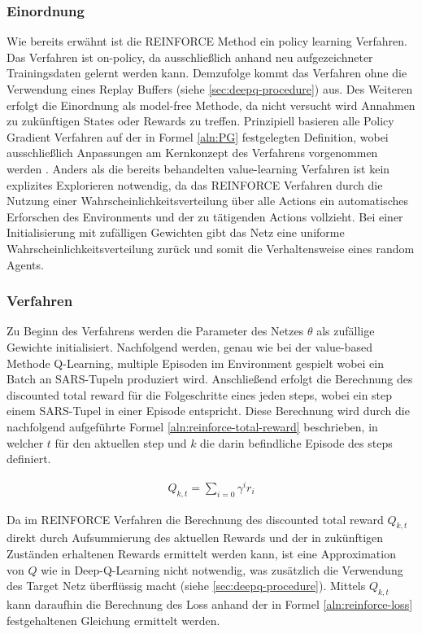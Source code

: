 \documentclass[11pt]{scrartcl}
\begin{document}
\subsubsection{Einordnung}
Wie bereits erwähnt ist die REINFORCE Method ein policy learning Verfahren. Das Verfahren ist
on-policy, da ausschließlich anhand neu aufgezeichneter Trainingsdaten gelernt werden kann.
Demzufolge kommt das Verfahren ohne die Verwendung eines Replay Buffers (siehe \autoref{sec:deepq-procedure}) aus. Des Weiteren erfolgt die Einordnung als model-free Methode, da nicht versucht wird
Annahmen zu zukünftigen States oder Rewards zu treffen. Prinzipiell basieren alle Policy
Gradient Verfahren auf der in Formel \ref{aln:PG} festgelegten Definition, wobei
ausschließlich Anpassungen am Kernkonzept des Verfahrens vorgenommen werden
\cite[~S.244 f.]{L2018}. Anders als die bereits behandelten value-learning Verfahren ist
kein explizites Explorieren notwendig, da das REINFORCE Verfahren durch die Nutzung einer
Wahrscheinlichkeitsverteilung über alle Actions ein automatisches \grqq Erforschen\grqq 
des Environments und der zu tätigenden Actions vollzieht. Bei einer Initialisierung mit
zufälligen Gewichten gibt das Netz eine uniforme Wahrscheinlichkeitsverteilung zurück und
somit die Verhaltensweise eines random Agents.


\subsubsection{Verfahren}
Zu Beginn des Verfahrens werden die Parameter des Netzes $\theta$ als zufällige Gewichte
initialisiert. Nachfolgend werden, genau wie bei der value-based Methode Q-Learning,
multiple Episoden im Environment gespielt wobei ein Batch an SARS-Tupeln produziert wird.
Anschließend erfolgt die Berechnung des discounted total reward für die Folgeschritte eines
jeden steps, wobei ein step einem SARS-Tupel in einer Episode entspricht. Diese Berechnung
wird durch die nachfolgend aufgeführte Formel \ref{aln:reinforce-total-reward} beschrieben,
in welcher $t$ für den aktuellen step und $k$ die darin befindliche Episode des steps
definiert. 

\begin{align}
Q_{k,t}=\sum_{i=0} \gamma^{i}r_{i}
\label{aln:reinforce-total-reward}
\end{align}

Da im REINFORCE Verfahren die Berechnung des discounted total reward $Q_{k,t}$ direkt durch
Aufsummierung des aktuellen Rewards und der in zukünftigen Zuständen erhaltenen Rewards
ermittelt werden kann, ist eine Approximation von $Q$ wie in Deep-Q-Learning nicht notwendig,
was zusätzlich die Verwendung des Target Netz überflüssig macht (siehe 
\autoref{sec:deepq-procedure}). Mittels $Q_{k,t}$ kann daraufhin die Berechnung des Loss
anhand der in Formel \ref{aln:reinforce-loss} festgehaltenen Gleichung ermittelt werden.
\end{document}
